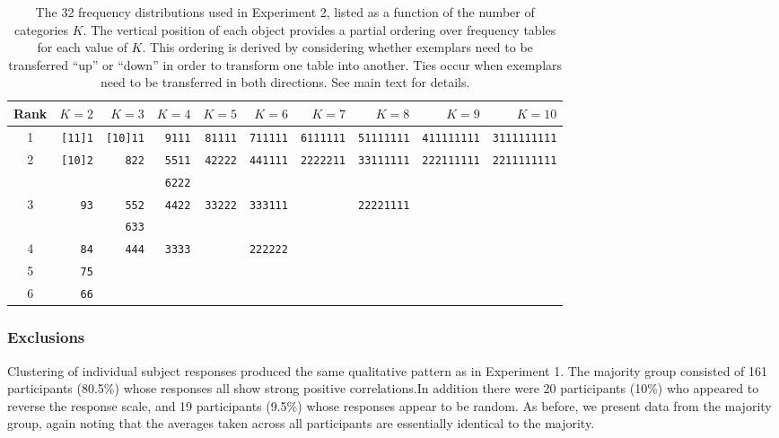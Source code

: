 \documentclass[doc]{apa6}
\newcommand{\dist}[1]{\texttt{#1}}
\begin{document}
\begin{table}[t]
\caption{The 32 frequency distributions used in Experiment 2, listed as a function of the number of categories $K$. The vertical position of each object provides a partial ordering over frequency tables for each value of $K$. This ordering is derived by considering whether exemplars need to be transferred ``up'' or ``down'' in order to transform one table into another. Ties occur when exemplars need to be transferred in both directions. See main text for details.\vspace*{6pt}}
\label{tab:exp2}
\footnotesize
\begin{tabular}{c|rrrrrrrrr}
Rank &        $K=2$ &        $K=3$  &       $K=4$ &       $K=5$  &         $K=6$ &         $K=7$  &        $K=8$    &           $K=9$  &  $K=10$ \\ \hline
1&\dist{[11]1} & \dist{[10]11} & \dist{9111} & \dist{81111} & \dist{711111} & \dist{6111111} & \dist{51111111} & \dist{411111111} & \dist{3111111111} \\
2&\dist{[10]2} & \dist{822}    & \dist{5511} & \dist{42222} & \dist{441111} & \dist{2222211} & \dist{33111111} & \dist{222111111} & \dist{2211111111}  \\
 &             &               & \dist{6222} &              &               &                & \\
3&\dist{93}    & \dist{552}    & \dist{4422} & \dist{33222} &  \dist{333111}&                & \dist{22221111} \\
 &             & \dist{633}    &             &              &               \\
4&\dist{84}    & \dist{444}    & \dist{3333} &              & \dist{222222} \\
5&\dist{75}    &               &  \\
6&\dist{66} \\
\end{tabular}
\end{table}

\subsubsection{Exclusions} Clustering of individual subject responses produced the same qualitative pattern as in Experiment 1. The majority group consisted of 161 participants (80.5\%) whose responses all show strong positive correlations.In addition there were 20 participants (10\%) who appeared to reverse the response scale, and 19 participants (9.5\%) whose responses appear to be random. As before, we present data from the majority group, again noting that the averages taken across all participants are essentially identical to the majority.
\end{document}
